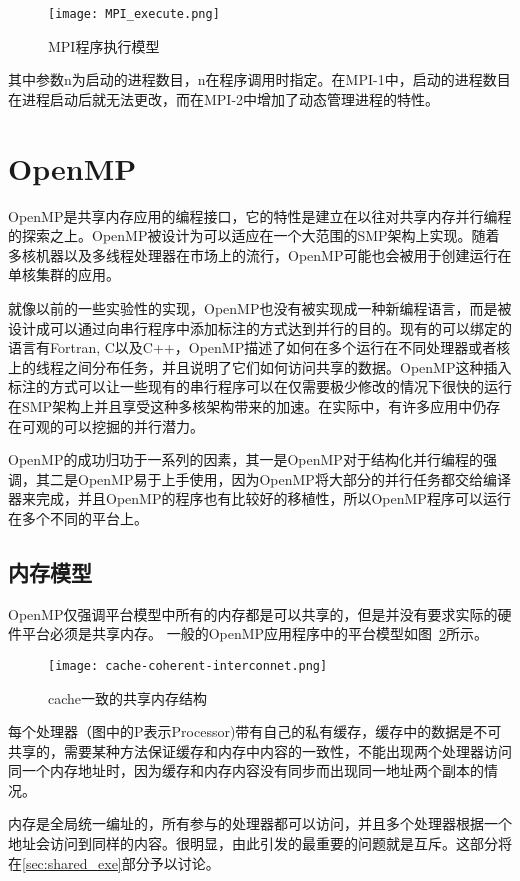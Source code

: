 \begin{figure}
\centering
\texttt{[image: MPI\_execute.png]}
\caption{MPI程序执行模型}\label{fig:mpi_exe}
\end{figure}

其中参数n为启动的进程数目，n在程序调用时指定。在MPI-1中，启动的进程数目在进程启动后就无法更改，而在MPI-2中增加了动态管理进程的特性。
\section{OpenMP}
OpenMP是共享内存应用的编程接口，它的特性是建立在以往对共享内存并行编程的探索之上。OpenMP被设计为可以适应在一个大范围的SMP架构上实现。随着多核机器以及多线程处理器在市场上的流行，OpenMP可能也会被用于创建运行在单核集群的应用。

就像以前的一些实验性的实现，OpenMP也没有被实现成一种新编程语言，而是被设计成可以通过向串行程序中添加标注的方式达到并行的目的。现有的可以绑定的语言有Fortran, C以及C++，OpenMP描述了如何在多个运行在不同处理器或者核上的线程之间分布任务，并且说明了它们如何访问共享的数据。OpenMP这种插入标注的方式可以让一些现有的串行程序可以在仅需要极少修改的情况下很快的运行在SMP架构上并且享受这种多核架构带来的加速。在实际中，有许多应用中仍存在可观的可以挖掘的并行潜力。

OpenMP的成功归功于一系列的因素，其一是OpenMP对于结构化并行编程的强调，其二是OpenMP易于上手使用，因为OpenMP将大部分的并行任务都交给编译器来完成，并且OpenMP的程序也有比较好的移植性，所以OpenMP程序可以运行在多个不同的平台上。


\subsection{内存模型}
OpenMP仅强调平台模型中所有的内存都是可以共享的，但是并没有要求实际的硬件平台必须是共享内存。
一般的OpenMP应用程序中的平台模型如图~\ref{fig:shared_memo}所示。
\begin{figure}
\centering
\texttt{[image: cache-coherent-interconnet.png]}
\caption{cache一致的共享内存结构}\label{fig:shared_memo}
\end{figure}

每个处理器（图中的P表示Processor)带有自己的私有缓存，缓存中的数据是不可共享的，需要某种方法保证缓存和内存中内容的一致性，不能出现两个处理器访问同一个内存地址时，因为缓存和内存内容没有同步而出现同一地址两个副本的情况。

内存是全局统一编址的，所有参与的处理器都可以访问，并且多个处理器根据一个地址会访问到同样的内容。很明显，由此引发的最重要的问题就是互斥。这部分将在\ref{sec:shared_exe}部分予以讨论。


